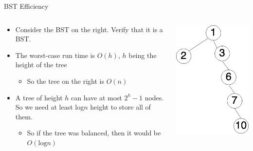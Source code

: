 \documentclass[
  ignorenonframetext,
]{beamer}
\providecommand{\tightlist}{%
  \setlength{\itemsep}{0pt}\setlength{\parskip}{0pt}}\usepackage{longtable,booktabs,array}
\begin{document}
\begin{frame}{BST Efficiency}
\protect\hypertarget{bst-efficiency}{}
\begin{columns}[T]
\begin{column}{0.7\textwidth}
\begin{itemize}
\item
  Consider the BST on the right. Verify that it is a BST.
\item
  The worst-case run time is \(O(h)\), \(h\) being the height of the
  tree

  \begin{itemize}
  \tightlist
  \item
    So the tree on the right is \(O(n)\)
  \end{itemize}
\item
  A tree of height \(h\) can have at most \(2^h - 1\) nodes. So we need
  at least log\(n\) height to store all of them.

  \begin{itemize}
  \tightlist
  \item
    So if the tree was balanced, then it would be \(O(\text{log}n)\)
  \end{itemize}
\end{itemize}
\end{column}

\begin{column}{0.3\textwidth}
\includegraphics{images/tree-unbal.png}
\end{column}
\end{columns}
\end{frame}
\end{document}
